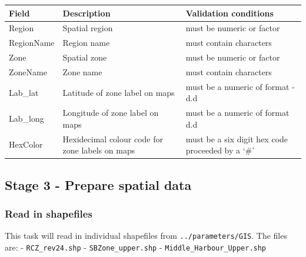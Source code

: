 \documentclass[
  8pt,
  a4paper]{article}
\begin{document}
\begin{itemize}
  \begin{longtable}[]{@{}
    >{\raggedright\arraybackslash}p{}
    >{\raggedright\arraybackslash}p{}
    >{\raggedright\arraybackslash}p{}@{}}
  \toprule\noalign{}
  \begin{minipage}[b]{\linewidth}\raggedright
  Field
  \end{minipage} & \begin{minipage}[b]{\linewidth}\raggedright
  Description
  \end{minipage} & \begin{minipage}[b]{\linewidth}\raggedright
  Validation conditions
  \end{minipage} \\
  \midrule\noalign{}
  \endhead
  \bottomrule\noalign{}
  \endlastfoot
  Region & Spatial region & must be numeric or factor \\
  RegionName & Region name & must contain characters \\
  Zone & Spatial zone & must be numeric or factor \\
  ZoneName & Zone name & must contain characters \\
  Lab\_lat & Latitude of zone label on maps & must be a numeric of
  format -d.d \\
  Lab\_long & Longitude of zone label on maps & must be a numeric of
  format d.d \\
  HexColor & Hexidecimal colour code for zone labels on maps & must be a
  six digit hex code proceeded by a `\#' \\
  \end{longtable}
\end{itemize}

\subsection{Stage 3 - Prepare spatial
data}\label{stage-3---prepare-spatial-data}

\subsubsection{Read in shapefiles}\label{read-in-shapefiles}

This task will read in individual shapefiles from
\texttt{../parameters/GIS}. The files are: - \texttt{RCZ\_rev24.shp} -
\texttt{SBZone\_upper.shp} - \texttt{Middle\_Harbour\_Upper.shp}
\end{document}
